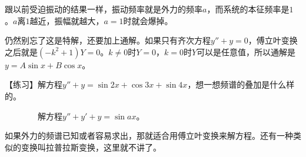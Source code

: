 跟以前受迫振动的结果一样，振动频率就是外力的频率$a$，而系统的本征频率是$1$。$a$离$1$越近，振幅就越大，$a=1$时就会爆掉。

仍然别忘了这是特解，还要加上通解。如果只有齐次方程$y''+y=0$，傅立叶变换之后就是$(-k^2+1) Y=0$。$k \neq 0$时$Y=0$，$k=0$时$Y$可以是任意值，所以通解是$y=A \sin x+B \cos x$。

【练习】解方程$y''+y=\sin 2 x+\cos 3 x+\sin 4 x$，想一想频谱的叠加是什么样的。

$\phantom{\text{【练习】}}$解方程$y''+y'+y=\sin a x$。

如果外力的频谱已知或者容易求出，那就适合用傅立叶变换来解方程。还有一种类似的变换叫拉普拉斯变换，这里就不讲了。
